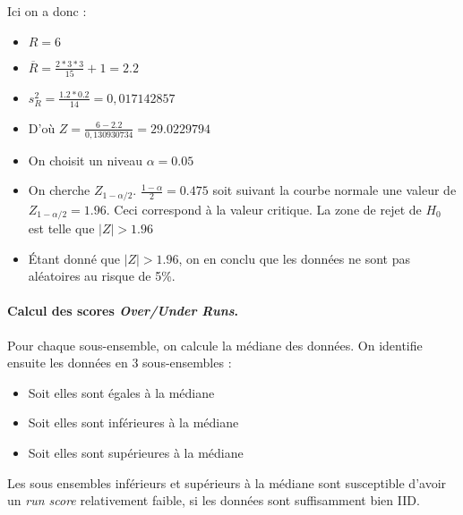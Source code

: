 Ici on a donc : 
\begin{itemize}
\item $R = 6$
\item $\overline{R}= \frac{2*3*3}{15}+1 = 2.2 $
\item $s_R^2 = \frac{1.2*0.2}{14} = 0,017142857$
\item D'où $ Z = \frac{6 -2.2}{0,130930734} = 29.0229794$
\item On choisit un niveau $\alpha=0.05$
\item On cherche $Z_{1-\alpha/2}$. $\frac{1-\alpha}{2}=0.475$ soit suivant la courbe normale une valeur de  $Z_{1-\alpha/2}=1.96$. Ceci correspond à la valeur critique. La zone de rejet de $H_0$ est telle que $|Z| > 1.96$
\item Étant donné que $|Z| > 1.96$, on en conclu que les données ne sont pas aléatoires au risque de 5\%.\\

\end{itemize}


\paragraph{Calcul des scores \textit{Over/Under Runs}.\\}
Pour chaque sous-ensemble, on calcule la médiane des données. On identifie ensuite les données en 3 sous-ensembles :
\begin{itemize}
\item Soit elles sont égales à la médiane
\item Soit elles sont inférieures à la médiane
\item Soit elles sont supérieures à la médiane
\end{itemize}
Les sous ensembles inférieurs et supérieurs à la médiane sont susceptible d'avoir un \textit{run score} relativement faible, si les données sont suffisamment bien IID.\\

